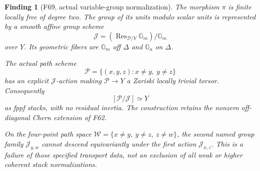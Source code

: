 \documentclass[11pt,a4paper]{article}
\newcommand{\mathscr}{\mathcal}
\newcommand{\fid}[1]{\textsf{#1}}\newcommand{\gate}[1]{\textsf{#1}}
\theoremstyle{named}\newtheorem{finding}{Finding}[section]
\theoremstyle{definition}\newtheorem{definition}[finding]{Definition}
\theoremstyle{remark}\newtheorem{remark}[finding]{Remark}
\begin{document}
\begin{finding}[\fid{F69}, actual variable-group normalization]
\label{f:variableGroupQuotient}
The morphism \(\pi\) is finite locally free of degree two.
The group of its units modulo scalar units is represented
by a smooth affine group scheme
\[
 \mathcal J=(\operatorname{Res}_{\mathscr D/Y}\mathbb G_m)/
                         \mathbb G_m
\]
over \(Y\). Its geometric fibers are \(\mathbb G_m\)
off \(\Delta\) and \(\mathbb G_a\) on \(\Delta\).

The actual path scheme
\[
 \mathcal P=\{(x,y,z):x\ne y,\ y\ne z\}
\]
has an explicit \(\mathcal J\)-action making
\(\mathcal P\to Y\) a Zariski locally trivial torsor.
Consequently
\[
                         [\mathcal P/\mathcal J]\simeq Y
\]
as fppf stacks, with no residual inertia.
The construction retains the nonzero off-diagonal
Chern extension of \fid{F62}.

On the four-point path space
\(\mathcal W=\{x\ne y,\ y\ne z,\ z\ne w\}\),
the second named group family \(\mathcal J_{y,w}\)
cannot descend equivariantly under the first action
\(\mathcal J_{x,z}\).
This is a failure of those specified transport data,
not an exclusion of all weak or higher coherent
stack normalizations.
\end{finding}
\end{document}

